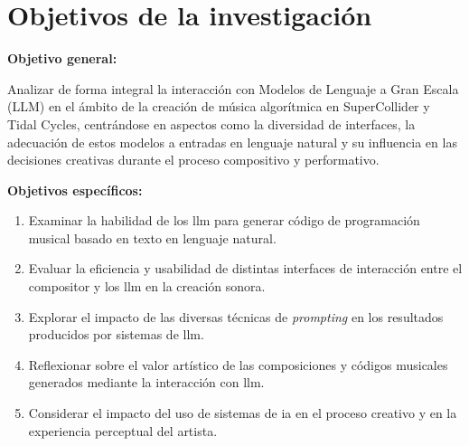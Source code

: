 \section{Objetivos de la investigación}
\label{sec:objetivos}



\textbf{Objetivo general:}

Analizar de forma integral la interacción con Modelos de Lenguaje a Gran Escala (LLM) en el ámbito de la creación de música algorítmica en SuperCollider y Tidal Cycles, centrándose en aspectos como la diversidad de interfaces, la adecuación de estos modelos a entradas en lenguaje natural y su influencia en las decisiones creativas durante el proceso compositivo y performativo.

\begin{samepage}
    \textbf{Objetivos específicos:}
    \begin{enumerate}[label=\alph*)]
        \item Examinar la habilidad de los \gls{llm} para generar código de programación musical basado en texto en lenguaje natural.
        \item Evaluar la eficiencia y usabilidad de distintas interfaces de interacción entre el compositor y los \gls{llm} en la creación sonora.
        \item Explorar el impacto de las diversas técnicas de \emph{prompting} en los resultados producidos por sistemas de \gls{llm}.
        \item Reflexionar sobre el valor artístico de las composiciones y códigos musicales generados mediante la interacción con \gls{llm}.
        \item Considerar el impacto del uso de sistemas de \gls{ia} en el proceso creativo y en la experiencia perceptual del artista.
    \end{enumerate}
\end{samepage}

